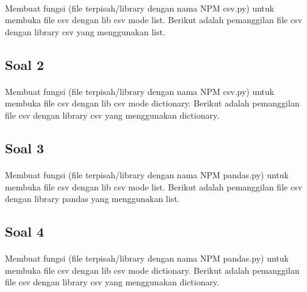 \documentclass{article}
\begin{document}
        \paragraph{}Membuat fungsi (file terpisah/library dengan nama NPM csv.py) untuk membuka file csv dengan lib csv mode list. Berikut adalah pemanggilan file csv dengan library csv yang menggunakan list.
        
    
    \subsection*{Soal 2}
        \paragraph{}Membuat fungsi (file terpisah/library dengan nama NPM csv.py) untuk membuka file csv dengan lib csv mode dictionary. Berikut adalah pemanggilan file csv dengan library csv yang menggunakan dictionary.
        
        
    \subsection*{Soal 3}
        \paragraph{}Membuat fungsi (file terpisah/library dengan nama NPM pandas.py) untuk membuka file csv dengan lib csv mode list. Berikut adalah pemanggilan file csv dengan library pandas yang menggunakan list.
        
        
    \subsection*{Soal 4}
        \paragraph{}Membuat fungsi (file terpisah/library dengan nama NPM pandas.py) untuk membuka file csv dengan lib csv mode dictionary. Berikut adalah pemanggilan file csv dengan library csv yang menggunakan dictionary.
        
        
\end{document}

